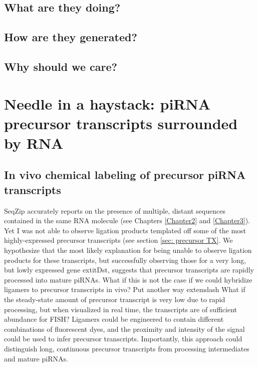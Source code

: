 

  \subsection{What are they doing?}


  \subsection{How are they generated?}


  \subsection{Why should we care?}

\section{Needle in a haystack: piRNA precursor transcripts surrounded by RNA}

  \subsection{In vivo chemical labeling of precursor piRNA transcripts}
    
    SeqZip accurately reports on the presence of multiple, distant sequences contained in the same RNA molecule (see Chapters \ref{Chapter2} and \ref{Chapter3}). Yet I was not able to observe ligation products templated off some of the most highly-expressed precursor transcripts (see section \ref{sec: precursor TX}. We hypothesize that the most likely explanation for being unable to observe ligation products for these transcripts, but successfully observing those for a very long, but lowly expressed gene   extit{Dst}, suggests that precursor transcripts are rapidly processed into mature piRNAs. What if this is not the case if we could hybridize ligamers to precursor transcripts in vivo? Put another way  extemdash What if the steady-state amount of precursor transcript is very low due to rapid processing, but when visualized in real time, the transcripts are of sufficient abundance for FISH? Ligamers could be engineered to contain different combinations of fluorescent dyes, and the proximity and intensity of the signal could be used to infer precursor transcripts. Importantly, this approach could distinguish long, continuous precursor transcripts from processing intermediates and mature piRNAs.

